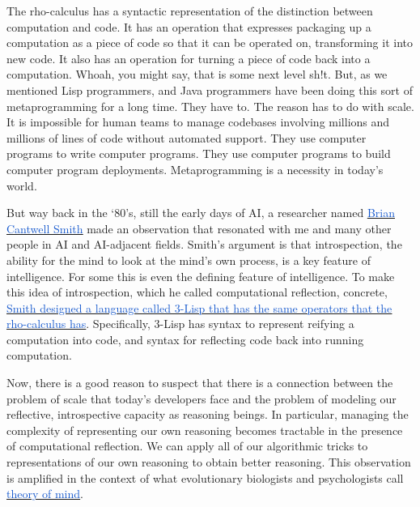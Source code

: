 \documentclass[runningheads]{llncs}
\begin{document}
The rho-calculus has a syntactic representation of the distinction between computation and code. It has an operation that expresses packaging up a computation as a piece of code so that it can be operated on, transforming it into new code. It also has an operation for turning a piece of code back into a computation. Whoah, you might say, that is some next level sh!t. But, as we mentioned Lisp programmers, and Java programmers have been doing this sort of metaprogramming for a long time. They have to. The reason has to do with scale. It is impossible for human teams to manage codebases involving millions and millions of lines of code without automated support. They use computer programs to write computer programs. They use computer programs to build computer program deployments. Metaprogramming is a necessity in today’s world.

\vspace{1\baselineskip}
But way back in the ‘80’s, still the early days of AI, a researcher named \href{https://en.wikipedia.org/wiki/Brian_Cantwell_Smith#:~:text=Brian\%20Cantwell\%20Smith\%20is\%20a,\%2C\%20and\%20philosophy\%2C\%20especially\%20ontology.}{\uline{\textcolor[HTML]{1155CC}{Brian Cantwell Smith}}} made an observation that resonated with me and many other people in AI and AI-adjacent fields. Smith’s argument is that introspection, the ability for the mind to look at the mind’s own process, is a key feature of intelligence. For some this is even the defining feature of intelligence. To make this idea of introspection, which he called computational reflection, concrete, \href{https://www.ics.uci.edu/~jajones/INF102-S18/readings/17_Smith84.pdf}{\uline{\textcolor[HTML]{1155CC}{Smith designed a language called 3-Lisp that has the same operators that the rho-calculus has}}}. Specifically, 3-Lisp has syntax to represent reifying a computation into code, and syntax for reflecting code back into running computation.

\vspace{1\baselineskip}
Now, there is a good reason to suspect that there is a connection between the problem of scale that today’s developers face and the problem of modeling our reflective, introspective capacity as reasoning beings. In particular, managing the complexity of representing our own reasoning becomes tractable in the presence of computational reflection. We can apply all of our algorithmic tricks to representations of our own reasoning to obtain better reasoning. This observation is amplified in the context of what evolutionary biologists and psychologists call \href{https://en.wikipedia.org/wiki/Theory_of_mind}{\uline{\textcolor[HTML]{1155CC}{theory of mind}}}. 
\end{document}
